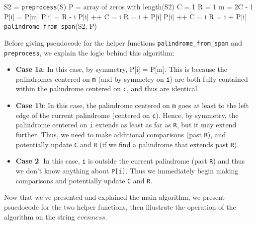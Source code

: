 \documentclass[paper=a4, fontsize=11pt]{scrartcl} %
\numberwithin{equation}{section} %
\numberwithin{figure}{section} %
\numberwithin{table}{section} %
\begin{document}
\begin{algorithmic}
	\State S2 = \texttt{preprocess}(S)
	\State P = array of zeros with length(S2)
	\State C = 1 
	\State R = 1 
		\State m = 2C - 1 
		 
			 
				\State P[i] = P[m]
			\Else {}
				\State P[i] = R - i
					\State P[i] ++
				\EndWhile
					\State C = i
					\State R = i + P[i]
				\EndIf
			\EndIf
		\Else {}
					\State P[i] ++
			\EndWhile
				\State C = i
				\State R = i + P[i]
			\EndIf
		\EndIf
	\EndFor
	\State \Return \texttt{palindrome\_from\_span}(S2, P)
\EndFunction
\end{algorithmic}

Before giving pseudocode for the helper functions \texttt{palindrome\_from\_span} and \texttt{preprocess}, we explain the logic behind this algorithm:
\begin{itemize}
\item \textbf{Case 1a}: In this case, by symmetry, P[i] = P[m]. This is because the palindromes centered on \texttt{m} (and by symmetry on \texttt{i}) are both fully contained within the palindrome centered on \texttt{c}, and thus are identical.
\item \textbf{Case 1b}: In this case, the palindrome centered on \texttt{m} goes at least to the left edge of the current palindrome (centered on \texttt{c}). Hence, by symmetry, the palindrome centered on \texttt{i} extends as least as far as \texttt{R}, but it may extend further. Thus, we need to make additional comparisons (past \texttt{R}), and potentially update \texttt{C} and \texttt{R} (if we find a palindrome that extends past \texttt{R}).   
\item \textbf{Case 2}: In this case, \texttt{i} is outside the current palindrome (past \texttt{R}) and thus we don't know anything about \texttt{P[i]}. Thus we immediately begin making comparisons and potentially update \texttt{C} and \texttt{R}.
\end{itemize}

Now that we've presented and explained the main algorithm, we present psuedocode for the two helper functions, then illustrate the operation of the algorithm on the string $evenness$. \\
\end{document}

